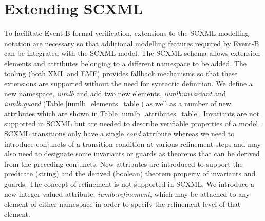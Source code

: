 
\section{Extending SCXML}
\label{sect:extension}


To facilitate Event-B formal verification, extensions to the SCXML 
modelling notation are necessary so that additional modelling features 
required by Event-B can be integrated with the SCXML model.
The SCXML schema allows extension elements and attributes belonging 
to a different namespace to be added. The tooling (both XML and EMF) 
provides fallback mechanisms so that these extensions are supported 
without the need for syntactic definition. We define a new namespace,  
\emph{iumlb} and add two new elements, \emph{iumlb:invariant} and 
\emph{iumlb:guard} (Table \ref{iumlb_elements_table}) as well as a 
number of new attributes which are shown in Table \ref{iumlb_attributes_table}.
Invariants are not supported in SCXML but are needed to describe 
verifiable properties of a model. SCXML transitions only have a single 
\emph{cond} attribute whereas we need to introduce conjuncts of a transition
condition at various refinement steps and may also need to designate some 
invariants or guards as theorems that can be derived from the preceding conjuncts. 
New attributes are introduced to support the predicate (string) and the 
derived (boolean) theorem property of invariants and guards. The concept 
of refinement is not supported in SCXML. We introduce a new integer valued 
attribute, \emph{iumlb:refinement}, which may be attached to any element of 
either namespace in order to specify the refinement level of that element. 


